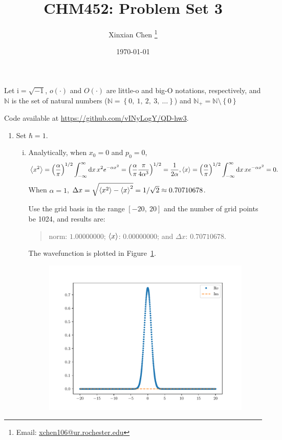 \documentclass{article}
\title{CHM452: Problem Set 3}
\author{Xinxian Chen%
\footnote{Email: \href{mailto:xchen106@ur.rochester.edu}{xchen106@ur.rochester.edu}}}
\date{\today}
\newcommand{\iu}{\ensuremath{\mathrm{i}}}
\newcommand{\set}[1]{\ensuremath{\left\{{#1}\right\}}}
\begin{document}
\maketitle

Let $\iu = \sqrt{-1}$, $o(\cdot)$ and $O(\cdot)$ are little-o and big-O notations, respectively, and $\mathbb{N}$ is the set of natural numbers ($\mathbb{N} = \set{0,\ 1,\ 2,\ 3,\ \ldots}$) and $\mathbb{N}_+ = \mathbb{N}\setminus\set{0}$

Code available at \url{https://github.com/vINyLogY/QD-hw3}.

\begin{enumerate}[1.]
  \item Set $\hbar = 1$.
  \begin{enumerate}[(i)]
    \item Analytically, when $x_0 = 0$ and $p_0 = 0$,
    \begin{align*}
      \ev{x^2} &= \qty(\frac{\alpha}{\pi})^{1/2}\int_{-\infty}^{\infty} \dd{x}x^2 e^{-\alpha x^2} 
      = \qty(\frac{\alpha}{\pi} \frac{\pi}{4\alpha^3})^{1/2}
      = \frac{1}{{2\alpha}},
      \ev{x} = \qty(\frac{\alpha}{\pi})^{1/2}\int_{-\infty}^{\infty} \dd{x}x e^{-\alpha x^2} 
      = 0.
    \end{align*}
    When $\alpha = 1$, $\Delta x = \sqrt{\ev{x^2} - \ev{x}^2} = 1/\sqrt{2} \approx 0.70710678$.
  
    Use the grid basis in the range $[-20,\ 20]$ and the number of grid points be 1024, and results are:
    \begin{quotation}
      norm: $1.00000000$; $\ev{x}$: $0.00000000$; and $\Delta x$: $0.70710678$.
    \end{quotation}
    The wavefunction is plotted in Figure~\ref{fig:1-1}.
    \begin{figure}[H]
      \centering
      \includegraphics[width=0.6\linewidth]{q1-1.pdf}
      \caption{}
      \label{fig:1-1}
    \end{figure}


\end{enumerate}
\end{enumerate}
\end{document}
